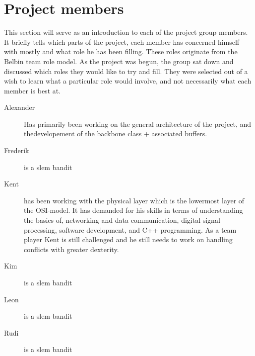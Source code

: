\section{Project members}
This section will serve as an introduction to each of the project group members. It briefly tells which parts of the project, each member has concerned himself with mostly and what role he has been filling. These roles originate from the Belbin team role model. As the project was begun, the group sat down and discussed which roles they would like to try and fill. They were selected out of a wish to learn what a particular role would involve, and not necessarily what each member is best at.

\begin{description}
 \item[Alexander] Has primarily been working on the general architecture of the project, and thedevelopement of the backbone class + associated buffers.


 \item[Frederik] is a slem bandit
 \item[Kent]
 has been working with the physical layer which is the lowermost layer of the OSI-model. It has demanded for his skills in terms of understanding the basics of, networking and data communication, digital signal processing, software development, and C++ programming. As a team player Kent is still challenged and he still needs to work on handling conflicts with greater dexterity.
 \item[Kim] is a slem bandit
 \item[Leon] is a slem bandit
 \item[Rudi] is a slem bandit
\end{description}